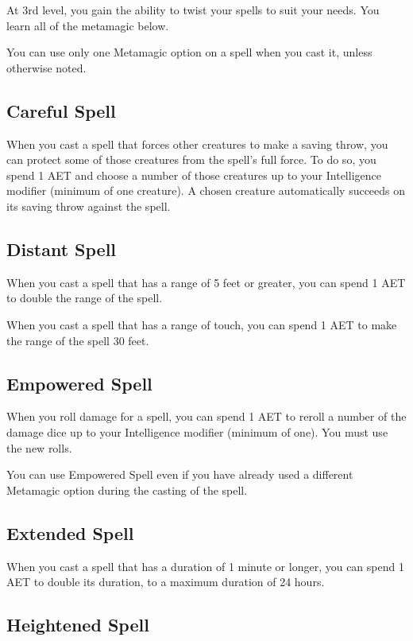 At 3rd level, you gain the ability to twist your spells to suit your needs. You learn all of the metamagic below.

You can use only one Metamagic option on a spell when you cast it, unless otherwise noted.

\subsection{Careful Spell}

When you cast a spell that forces other creatures to make a saving throw, you can protect some of those creatures from the spell's full force. To do so, you spend 1 AET and choose a number of those creatures up to your Intelligence modifier (minimum of one creature). A chosen creature automatically succeeds on its saving throw against the spell.

\subsection{Distant Spell}

When you cast a spell that has a range of 5 feet or greater, you can spend 1 AET to double the range of the spell.

When you cast a spell that has a range of touch, you can spend 1 AET to make the range of the spell 30 feet.

\subsection{Empowered Spell}

When you roll damage for a spell, you can spend 1 AET to reroll a number of the damage dice up to your Intelligence modifier (minimum of one). You must use the new rolls.

You can use Empowered Spell even if you have already used a different Metamagic option during the casting of the spell.

\subsection{Extended Spell}

When you cast a spell that has a duration of 1 minute or longer, you can spend 1 AET to double its duration, to a maximum duration of 24 hours.

\subsection{Heightened Spell}

